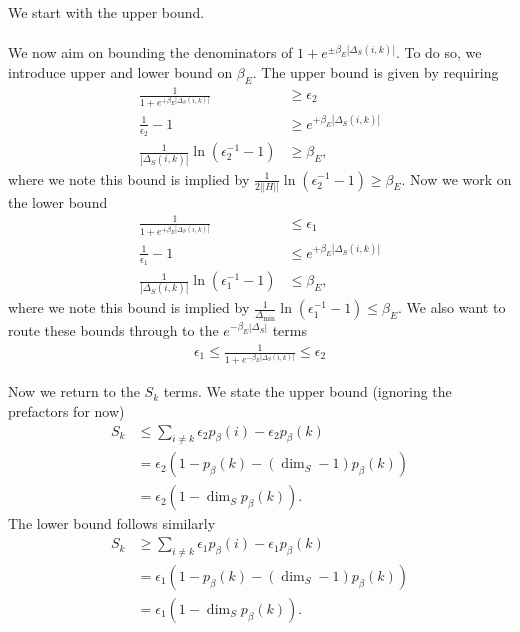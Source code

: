 \documentclass{article}
\newcommand{\norm}[1]{\left| \left| #1 \right| \right|}
\begin{document}
We start with the upper bound.
\begin{align}
    
\end{align}


\newpage

We now aim on bounding the denominators of $1 + e^{\pm \beta_E |\Delta_S(i,k)|}$. To do so, we introduce upper and lower bound on $\beta_E$. The upper bound is given by requiring 
\begin{align}
    \frac{1}{1 + e^{+\beta_E |\Delta_S(i,k)|}} &\geq \epsilon_2 \\
    \frac{1}{\epsilon_2} - 1 &\geq e^{+\beta_E |\Delta_S(i,k)|} \\
    \frac{1}{|\Delta_S(i,k)|} \ln (\epsilon_2^{-1} - 1) &\geq \beta_E,
\end{align}
where we note this bound is implied by $\frac{1}{2 \norm{H}} \ln(\epsilon_2^{-1} - 1 ) \geq \beta_E$. Now we work on the lower bound
\begin{align}
    \frac{1}{1 + e^{+\beta_E |\Delta_S(i,k)|}} &\leq \epsilon_1 \\
    \frac{1}{\epsilon_1} - 1 &\leq e^{+\beta_E |\Delta_S(i,k)|} \\
    \frac{1}{|\Delta_S(i,k)|} \ln (\epsilon_1^{-1} - 1) &\leq \beta_E,
\end{align}
where we note this bound is implied by $\frac{1}{\Delta_{\min}} \ln (\epsilon_1^{-1} - 1) \leq \beta_E$. We also want to route these bounds through to the $e^{-\beta_E |\Delta_S|}$ terms
\begin{align}
    \epsilon_1 \leq \frac{1}{1 + e^{-\beta_E |\Delta_S(i,k)|}} \leq \epsilon_2
\end{align}

Now we return to the $S_k$ terms. We state the upper bound (ignoring the prefactors for now)
\begin{align}
    S_k &\leq \sum_{i \neq k} \epsilon_{2} p_{\beta}(i) - \epsilon_{2} p_{\beta}(k) \\
    &= \epsilon_{2} (1 - p_{\beta}(k) - (\dim_S - 1)p_{\beta}(k)) \\
    &= \epsilon_{2}(1 - \dim_S p_{\beta}(k)).
\end{align}
The lower bound follows similarly
\begin{align}
    S_{k} &\geq \sum_{i \neq k} \epsilon_{1} p_{\beta}(i) - \epsilon_{1} p_{\beta}(k) \\
    &= \epsilon_{1}(1 - p_{\beta}(k) - (\dim_S - 1) p_{\beta}(k)) \\
    &= \epsilon_{1}(1 - \dim_S p_{\beta}(k)).
\end{align}
\end{document}
